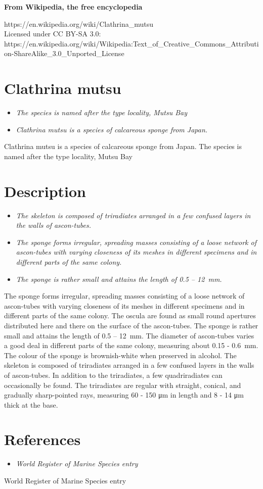 \textbf{From Wikipedia, the free encyclopedia}

https://en.wikipedia.org/wiki/Clathrina\_mutsu\\
Licensed under CC BY-SA 3.0:\\
https://en.wikipedia.org/wiki/Wikipedia:Text\_of\_Creative\_Commons\_Attribution-ShareAlike\_3.0\_Unported\_License

\section{Clathrina mutsu}\label{clathrina-mutsu}

\begin{itemize}
\item
  \emph{The species is named after the type locality, Mutsu Bay}
\item
  \emph{Clathrina mutsu is a species of calcareous sponge from Japan.}
\end{itemize}

Clathrina mutsu is a species of calcareous sponge from Japan. The
species is named after the type locality, Mutsu Bay

\section{Description}\label{description}

\begin{itemize}
\item
  \emph{The skeleton is composed of triradiates arranged in a few
  confused layers in the walls of ascon-tubes.}
\item
  \emph{The sponge forms irregular, spreading masses consisting of a
  loose network of ascon-tubes with varying closeness of its meshes in
  different specimens and in different parts of the same colony.}
\item
  \emph{The sponge is rather small and attains the length of 0.5 --
  12~mm.}
\end{itemize}

The sponge forms irregular, spreading masses consisting of a loose
network of ascon-tubes with varying closeness of its meshes in different
specimens and in different parts of the same colony. The oscula are
found as small round apertures distributed here and there on the surface
of the ascon-tubes. The sponge is rather small and attains the length of
0.5 -- 12~mm. The diameter of ascon-tubes varies a good deal in
different parts of the same colony, measuring about 0.15 - 0.6~mm. The
colour of the sponge is brownish-white when preserved in alcohol. The
skeleton is composed of triradiates arranged in a few confused layers in
the walls of ascon-tubes. In addition to the triradiates, a few
quadriradiates can occasionally be found. The triradiates are regular
with straight, conical, and gradually sharp-pointed rays, measuring 60 -
150 μm in length and 8 - 14 μm thick at the base.

\section{References}\label{references}

\begin{itemize}
\item
  \emph{World Register of Marine Species entry}
\end{itemize}

World Register of Marine Species entry
